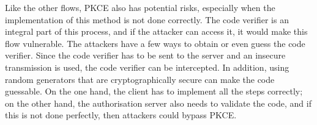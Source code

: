 Like the other flows, PKCE also has potential risks, especially when the implementation of this method is not done correctly. The code verifier is an integral part of this process, and if the attacker can access it, it would make this flow vulnerable. The attackers have a few ways to obtain or even guess the code verifier. Since the code verifier has to be sent to the server and an insecure transmission is used, the code verifier can be intercepted. In addition, using random generators that are cryptographically secure can make the code guessable. On the one hand, the client has to implement all the steps correctly; on the other hand, the authorisation server also needs to validate the code, and if this is not done perfectly, then attackers could bypass PKCE.   


\begingroup
\centering
\setlength{\tabcolsep}{6.5pt} %
